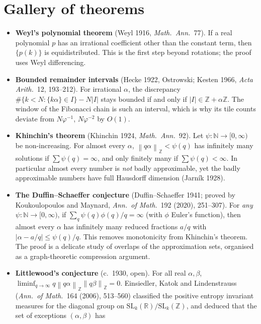 \documentclass[11pt,openany]{book}
\theoremstyle{plain}
\theoremstyle{definition}
\theoremstyle{remark}
\newcommand{\R}{\mathbb{R}}
\newcommand{\Z}{\mathbb{Z}}
\newcommand{\N}{\mathbb{N}}
\newcommand{\SL}{\mathrm{SL}}
\newcommand{\abs}[1]{\left\lvert #1 \right\rvert}
\newcommand{\norm}[1]{\left\lVert #1 \right\rVert}
\begin{document}
\section{Gallery of theorems}
\label{ERG:sec:gallery}

\begin{itemize}[leftmargin=1.2em,itemsep=0.45em]
\item \textbf{Weyl's polynomial theorem} (Weyl 1916, \emph{Math.\ Ann.}~77). If a real polynomial $p$
  has an irrational coefficient other than the constant term, then $\{p(k)\}$ is equidistributed. This is
  the first step beyond rotations; the proof uses Weyl differencing.
\item \textbf{Bounded remainder intervals} (Hecke 1922, Ostrowski; Kesten 1966, \emph{Acta Arith.}~12,
  193--212). For irrational $\alpha$, the discrepancy $\#\{k<N:\{k\alpha\}\in I\}-N\abs I$ stays bounded
  if and only if $\abs I\in\Z+\alpha\Z$. The window of the Fibonacci chain is such an interval, which is
  why its tile counts deviate from $N\varphi^{-1}$, $N\varphi^{-2}$ by $O(1)$.
\item \textbf{Khinchin's theorem} (Khinchin 1924, \emph{Math.\ Ann.}~92). Let $\psi\colon\N\to[0,\infty)$ be
  non-increasing. For almost every $\alpha$, $\norm{q\alpha}_\Z<\psi(q)$ has infinitely many solutions if
  $\sum\psi(q)=\infty$, and only finitely many if $\sum\psi(q)<\infty$. In particular almost every number
  is \emph{not} badly approximable, yet the badly approximable numbers have full Hausdorff dimension
  (Jarn\'ik 1928).
\item \textbf{The Duffin--Schaeffer conjecture} (Duffin--Schaeffer 1941; proved by Koukoulopoulos and
  Maynard, \emph{Ann.\ of Math.}~192 (2020), 251--307). For \emph{any} $\psi\colon\N\to[0,\infty)$, if
  $\sum_q\psi(q)\phi(q)/q=\infty$ (with $\phi$ Euler's function), then almost every $\alpha$ has infinitely
  many reduced fractions $a/q$ with $\abs{\alpha-a/q}\le\psi(q)/q$. This removes monotonicity from
  Khinchin's theorem. The proof is a delicate study of overlaps of the approximation sets, organised as a
  graph-theoretic compression argument.
\item \textbf{Littlewood's conjecture} (c.~1930, open). For all real $\alpha,\beta$,
  $\liminf_{q\to\infty}q\norm{q\alpha}_\Z\norm{q\beta}_\Z=0$. Einsiedler, Katok and Lindenstrauss
  (\emph{Ann.\ of Math.}~164 (2006), 513--560) classified the positive entropy invariant measures for the
  diagonal group on $\SL_k(\R)/\SL_k(\Z)$, and deduced that the set of exceptions $(\alpha,\beta)$ has

\end{itemize}
\end{document}

